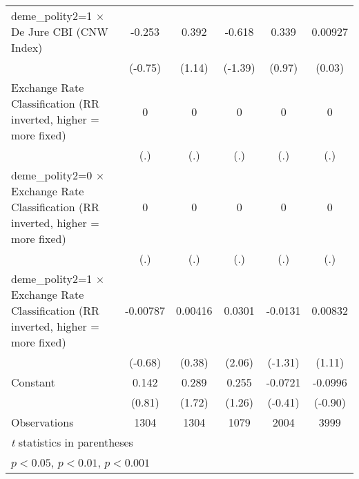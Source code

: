 {\begin{tabular*}{\linewidth}{@{\hskip\tabcolsep\extracolsep\fill}l*{5}{c}}
\addlinespace
deme\_polity2=1 $\times$ De Jure CBI (CNW Index)&   -0.253         &    0.392         &   -0.618         &    0.339         &  0.00927         \\
                &  (-0.75)         &   (1.14)         &  (-1.39)         &   (0.97)         &   (0.03)         \\
\addlinespace
Exchange Rate Classification (RR inverted, higher = more fixed)&        0         &        0         &        0         &        0         &        0         \\
                &      (.)         &      (.)         &      (.)         &      (.)         &      (.)         \\
\addlinespace
deme\_polity2=0 $\times$ Exchange Rate Classification (RR inverted, higher = more fixed)&        0         &        0         &        0         &        0         &        0         \\
                &      (.)         &      (.)         &      (.)         &      (.)         &      (.)         \\
\addlinespace
deme\_polity2=1 $\times$ Exchange Rate Classification (RR inverted, higher = more fixed)& -0.00787         &  0.00416         &   0.0301\sym{*}  &  -0.0131         &  0.00832         \\
                &  (-0.68)         &   (0.38)         &   (2.06)         &  (-1.31)         &   (1.11)         \\
\addlinespace
Constant        &    0.142         &    0.289         &    0.255         &  -0.0721         &  -0.0996         \\
                &   (0.81)         &   (1.72)         &   (1.26)         &  (-0.41)         &  (-0.90)         \\
\midrule
Observations    &     1304         &     1304         &     1079         &     2004         &     3999         \\
\bottomrule
\multicolumn{6}{l}{\footnotesize \textit{t} statistics in parentheses}\\
\multicolumn{6}{l}{\footnotesize \sym{*} \(p<0.05\), \sym{**} \(p<0.01\), \sym{***} \(p<0.001\)}\\
\end{tabular*}
}

